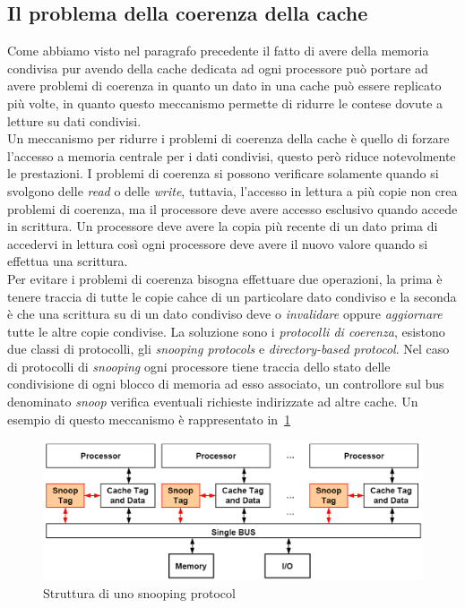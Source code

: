 \subsection{Il problema della coerenza della cache}
Come abbiamo visto nel paragrafo precedente il fatto di avere della memoria condivisa pur avendo della cache dedicata ad ogni processore può portare ad avere problemi di coerenza in quanto un dato in una cache può essere replicato più volte, in quanto questo meccanismo permette di ridurre le contese dovute a letture su dati condivisi.\\
Un meccanismo per ridurre i problemi di coerenza della cache è quello di forzare l'accesso a memoria centrale per i dati condivisi, questo però riduce notevolmente le prestazioni. I problemi di coerenza si possono verificare solamente quando si svolgono delle \emph{read} o delle \emph{write}, tuttavia, l'accesso in lettura a più copie non crea problemi di coerenza, ma il processore deve avere accesso esclusivo quando accede in scrittura. Un processore deve avere la copia più recente di un dato prima di accedervi in lettura così ogni processore deve avere il nuovo valore quando si effettua una scrittura.\\
Per evitare i problemi di coerenza bisogna effettuare due operazioni, la prima è tenere traccia di tutte le copie cahce di un particolare dato condiviso e la seconda è che una scrittura su di un dato condiviso deve o \emph{invalidare}  oppure \emph{aggiornare} tutte le altre copie condivise. La soluzione sono i \emph{protocolli di coerenza}, esistono due classi di protocolli, gli \emph{snooping protocols} e \emph{directory-based protocol}.
Nel caso di protocolli di \emph{snooping} ogni processore tiene traccia dello stato delle condivisione di ogni blocco di memoria ad esso associato, un controllore sul bus denominato \emph{snoop} verifica eventuali richieste indirizzate ad altre cache. Un esempio di questo meccanismo è rappresentato in \figurename\,\ref{fig:snoopprot}
\begin{figure}[htb]
\centering
\includegraphics[scale=0.5]{img/snoopprot.png}
\caption{Struttura di uno snooping protocol}\label{fig:snoopprot}
\end{figure}
